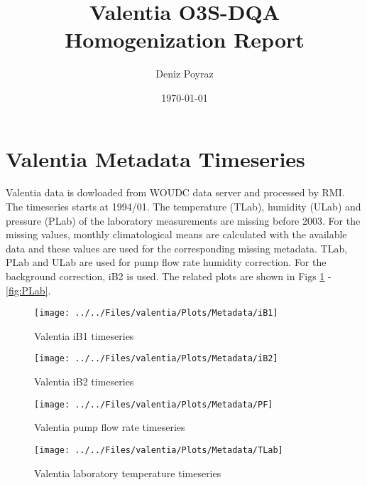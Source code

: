 \documentclass{article}
\title{Valentia O3S-DQA Homogenization Report}
\author{Deniz Poyraz}
\date{\today}
\begin{document}
\maketitle

\section{Valentia Metadata Timeseries}
\label{sec:metadata}

Valentia data is dowloaded from WOUDC data server and processed by RMI. The timeseries starts at 1994/01.
The temperature (TLab), humidity (ULab) and pressure (PLab) of the laboratory measurements are missing before 2003.
For the missing values, monthly climatological means are calculated with the available data and these values are used for the corresponding missing metadata.
TLab, PLab and ULab are used for pump flow rate humidity correction. For the background correction, iB2 is used.
The related plots are shown in Figs \ref{fig:iB1} - \ref{fig:PLab}.



    \begin{figure}
        \centering
\texttt{[image: ../../Files/valentia/Plots/Metadata/iB1]}
    \caption{Valentia iB1 timeseries}
            \label{fig:iB1}
    \end{figure}

    \begin{figure}
        \centering
\texttt{[image: ../../Files/valentia/Plots/Metadata/iB2]}
    \caption{Valentia iB2 timeseries}
            \label{fig:iB2}
    \end{figure}

    \begin{figure}
        \centering
\texttt{[image: ../../Files/valentia/Plots/Metadata/PF]}
    \caption{Valentia pump flow rate timeseries}
            \label{fig:PF}
    \end{figure}



           \begin{figure}
        \centering
\texttt{[image: ../../Files/valentia/Plots/Metadata/TLab]}
    \caption{Valentia laboratory temperature timeseries}
            \label{fig:TLab}
    \end{figure}
\end{document}
